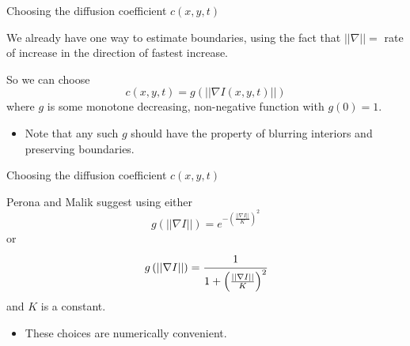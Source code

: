 \documentclass{beamer}
\begin{document}
\begin{frame}{Choosing the diffusion coefficient $c(x,y,t)$}

    \begin{block}{}
        We already have one way to estimate boundaries, using the fact that $||\nabla||=$ rate of increase in the direction of fastest increase.
    \end{block}
    
    \begin{block}{}
        So we can choose
        \begin{equation*}
            c(x,y,t)=g(||\nabla I(x,y,t)||)
        \end{equation*}
    where $g$ is some monotone decreasing, non-negative function with $g(0)=1$.
    
    \begin{itemize}
        \item Note that any such $g$ should have the property of blurring interiors and preserving boundaries.
    \end{itemize}
    \end{block}
    

\end{frame}

\begin{frame}{Choosing the diffusion coefficient $c(x,y,t)$}

    Perona and Malik suggest using either 
    \begin{equation*}
        g\left(||\nabla I ||\right)=e^{-\left(\frac{||\nabla I ||}{K}\right)^2}
    \end{equation*}
    or 
    \begin{equation*}
        g\left(||\nabla I ||\right)=\cfrac{1}{1+\left(\frac{||\nabla I ||}{K}\right)^2}
    \end{equation*}
    and $K$ is a constant.
    
    \begin{itemize}
        \item These choices are numerically convenient.
    \end{itemize}

\end{frame}
\end{document}
